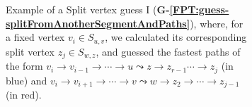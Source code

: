 \documentclass[a4paper,UKenglish,cleveref, autoref, thm-restate]{lipics-v2021}
\begin{document}
\begin{figure}[t]
	\begin{subfigure}[b]{0.48\textwidth}
		\vspace{-0.4cm}
        \centering
		\caption{Example of a Split vertex guess I (\textcolor{lipicsGray}{\textsf{\textbf{G-\ref{FPT:guess-splitFromAnotherSegmentAndPaths}}}}), where, for a fixed vertex $v_i \in S_{u,v}$,
			we calculated its corresponding split vertex $z_j \in S_{w,z}$,
			and guessed the fastest paths of the form
			$v_i \rightarrow v_{i-1} \rightarrow \cdots \rightarrow u \leadsto z \rightarrow z_{r-1} \cdots \rightarrow z_j$ (in blue) 
			and $v_i \rightarrow v_{i+1} \rightarrow \cdots \rightarrow v \leadsto w \rightarrow z_2 \rightarrow \cdots \rightarrow z_{j-1}$ (in red). 
			\label{fig:FPT-guessG6}}
	\end{subfigure}
	\quad
	\begin{subfigure}[b]{0.48\textwidth}
		\centering

\end{subfigure}
\end{figure}
\end{document}
